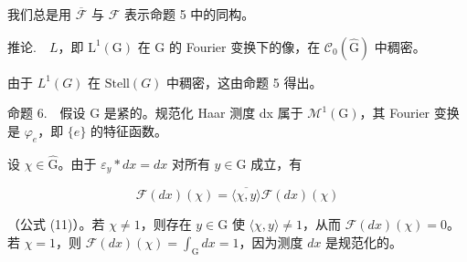 我们总是用 \(\overline{\mathcal{F}}\) 与 \(\mathcal{F}\) 表示命题 5 中的同构。

推论.　\(L\)，即 \(\mathrm{L}^{1}(\mathrm{G})\) 在 G 的 Fourier 变换下的像，在 \(\mathcal{C}_{0}(\widehat{\mathrm{G}})\) 中稠密。

由于 \(L^{1}(G)\) 在 \(\text{Stell}(G)\) 中稠密，这由命题 5 得出。

命题 6.　假设 G 是紧的。规范化 Haar 测度 dx 属于 \(\mathcal{M}^{1}(\mathrm{G})\)，其 Fourier 变换是 \(\varphi_{e}\)，即 \(\{e\}\) 的特征函数。

设 \(\chi \in \widehat{\mathrm{G}}\)。由于 \(\varepsilon_y * dx = dx\) 对所有 \(y \in \mathrm{G}\) 成立，有

\[
\mathcal {F} (d x) (\chi) = \overline {{\langle \chi , y \rangle}} \mathcal {F} (d x) (\chi)
\]

（公式 (11)）。若 \(\chi \neq 1\)，则存在 \(y \in \mathrm{G}\) 使 \(\langle \chi, y \rangle \neq 1\)，从而 \(\mathcal{F}(dx)(\chi) = 0\)。若 \(\chi = 1\)，则 \(\mathcal{F}(dx)(\chi) = \int_{\mathrm{G}} dx = 1\)，因为测度 \(dx\) 是规范化的。

